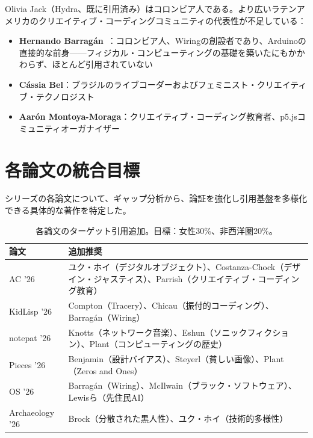 \documentclass[10pt,letterpaper,twocolumn]{article}
\begin{document}
Olivia Jack（Hydra、既に引用済み）はコロンビア人である。より広いラテンアメリカのクリエイティブ・コーディングコミュニティの代表性が不足している：

\begin{itemize}
  \item \textbf{Hernando Barrag\'an}~\citep{barragan2004wiring}：コロンビア人、Wiringの創設者であり、Arduinoの直接的な前身——フィジカル・コンピューティングの基礎を築いたにもかかわらず、ほとんど引用されていない
  \item \textbf{C\'assia Bel}：ブラジルのライブコーダーおよびフェミニスト・クリエイティブ・テクノロジスト
  \item \textbf{Aar\'on Montoya-Moraga}：クリエイティブ・コーディング教育者、p5.jsコミュニティオーガナイザー
\end{itemize}


\section{各論文の統合目標}

シリーズの各論文について、ギャップ分析から、論証を強化し引用基盤を多様化できる具体的な著作を特定した。

\begin{table}[h]
\small
\centering
\begin{tabularx}{\columnwidth}{lX}
\toprule
\textbf{論文} & \textbf{追加推奨} \\
\midrule
AC '26 & ユク・ホイ（デジタルオブジェクト）、Costanza-Chock（デザイン・ジャスティス）、Parrish（クリエイティブ・コーディング教育） \\
\addlinespace
KidLisp '26 & Compton（Tracery）、Chicau（振付的コーディング）、Barrag\'an（Wiring） \\
\addlinespace
notepat '26 & Knotts（ネットワーク音楽）、Eshun（ソニックフィクション）、Plant（コンピューティングの歴史） \\
\addlinespace
Pieces '26 & Benjamin（設計バイアス）、Steyerl（貧しい画像）、Plant（Zeros and Ones） \\
\addlinespace
OS '26 & Barrag\'an（Wiring）、McIlwain（ブラック・ソフトウェア）、Lewisら（先住民AI） \\
\addlinespace
Archaeology '26 & Brock（分散された黒人性）、ユク・ホイ（技術的多様性） \\
\bottomrule
\end{tabularx}
\caption{各論文のターゲット引用追加。目標：女性30\%、非西洋圏20\%。}
\label{tab:targets}
\end{table}
\end{document}
